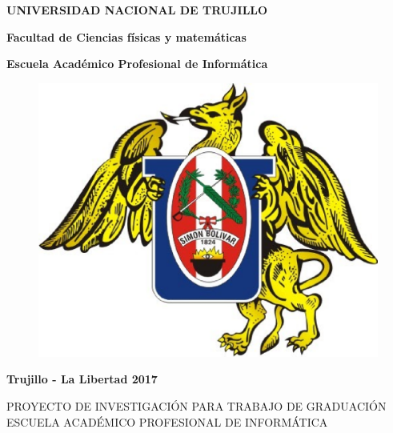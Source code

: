 \documentclass[a4paper, 12pt]{article}
\begin{document}
\begin{center}
 {\bf {\fontsize{14}{16.8}\selectfont UNIVERSIDAD NACIONAL DE TRUJILLO}}     
 
    {\bf{\fontsize{14}{16.8}\selectfont Facultad de Ciencias físicas y matemáticas}} 

  {\bf{\fontsize{14}{16.8}\selectfont Escuela Académico Profesional de Informática}}
\end{center}  

\begin{figure}[ht]
\begin{center}
\includegraphics[width=.3\textwidth]{unt}
\end{center}
\end{figure}
\vskip 1cm
\begin{center}
  { \bf {\fontsize{17}{20.4}\selectfont{RECONOCIMIENTO AUTOMÁTICO DE SEÑALES DE TRÁNSITO MEDIANTE PROCESAMIENTO DE IMÁGENES Y RED NEURONAL PERCEPTRÓN MULTICAPA}}  } 
\end{center}   
  \vskip 1cm
  { \bf {\fontsize{17}{20.4}}  } 
  \vskip 1cm
  { \bf {\fontsize{17}{20.4}}  } 
  \vskip 1cm
  { \bf {\fontsize{17}{20.4}}  } 
  \vskip 1cm
  { \bf {\fontsize{17}{20.4}}  }
  \vskip 1cm
  { \bf {\fontsize{17}{20.4}}  } 
\vskip 4cm
\begin{center}    
{\bf {\fontsize{14}{16.8}\selectfont Trujillo - La Libertad
\vskip 0.0cm
\hspace*{-0.2cm} 
2017 }}
\end{center} 
\newpage

\begin{center}
\Large {PROYECTO DE INVESTIGACIÓN PARA TRABAJO DE GRADUACIÓN \\
\vskip 0.2cm
 ESCUELA ACADÉMICO PROFESIONAL DE INFORMÁTICA}
\end{center}
\vskip 1cm
\end{document}
